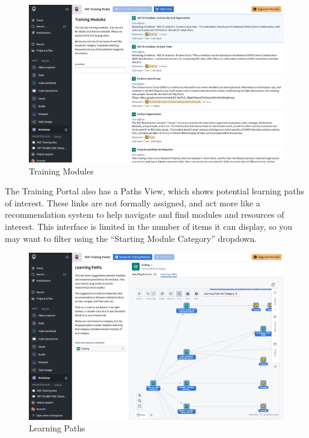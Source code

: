 \documentclass[
  letterpaper,
  DIV=11,
  numbers=noendperiod]{scrreprt}
\begin{document}
\begin{figure}

{\centering \includegraphics{chapters/images/support/image-12-training-modules.png}

}

\caption{\label{fig-support-training-modules}Training Modules}

\end{figure}

The Training Portal also has a Paths View, which shows potential
learning paths of interest. These links are not formally assigned, and
act more like a recommendation system to help navigate and find modules
and resources of interest. This interface is limited in the number of
items it can display, so you may want to filter using the ``Starting
Module Category'' dropdown.

\begin{figure}

{\centering \includegraphics{chapters/images/support/image-13-training-paths.png}

}

\caption{\label{fig-training-paths}Learning Paths}

\end{figure}
\end{document}
